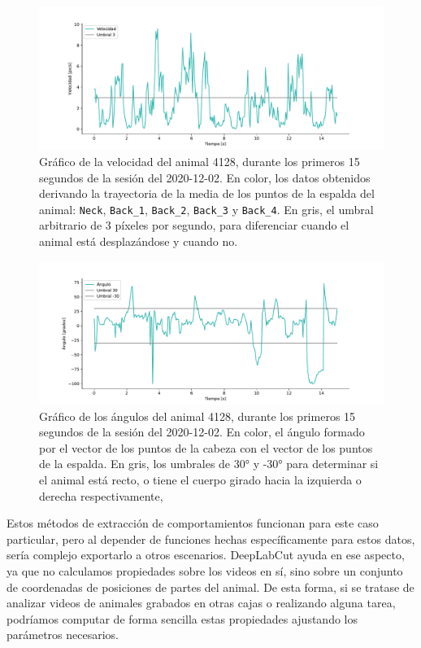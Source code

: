 \begin{figure}[h]
  \centering
  \includegraphics[width=\textwidth]{figures/speed-4128-2020-12-02-threshold-3-15s.pdf}
  \caption[Velocidad del animal.]{Gráfico de la velocidad del animal 4128, durante los primeros 15 segundos de la sesión del 2020-12-02. En color, los datos obtenidos derivando la trayectoria de la media de los puntos de la espalda del animal: \texttt{Neck}, \texttt{Back\_1}, \texttt{Back\_2}, \texttt{Back\_3} y \texttt{Back\_4}. En gris, el umbral arbitrario de 3 píxeles por segundo, para diferenciar cuando el animal está desplazándose y cuando no.}
  \label{fig:speed}
\end{figure}

\begin{figure}[h]
  \centering
  \includegraphics[width=\textwidth]{figures/angles-4128-2020-12-02-threshold-30-15s.pdf}
  \caption[Ángulos del animal.]{Gráfico de los ángulos del animal 4128, durante los primeros 15 segundos de la sesión del 2020-12-02. En color, el ángulo formado por el vector de los puntos de la cabeza con el vector de los puntos de la espalda. En gris, los umbrales de 30° y -30° para determinar si el animal está recto, o tiene el cuerpo girado hacia la izquierda o derecha respectivamente,}
  \label{fig:angles}
\end{figure}

Estos métodos de extracción de comportamientos funcionan para este caso particular, pero al depender de funciones hechas específicamente para estos datos, sería complejo exportarlo a otros escenarios. DeepLabCut ayuda en ese aspecto, ya que no calculamos propiedades sobre los videos en sí, sino sobre un conjunto de coordenadas de posiciones de partes del animal. De esta forma, si se tratase de analizar videos de animales grabados en otras cajas o realizando alguna tarea, podríamos computar de forma sencilla estas propiedades ajustando los parámetros necesarios.

